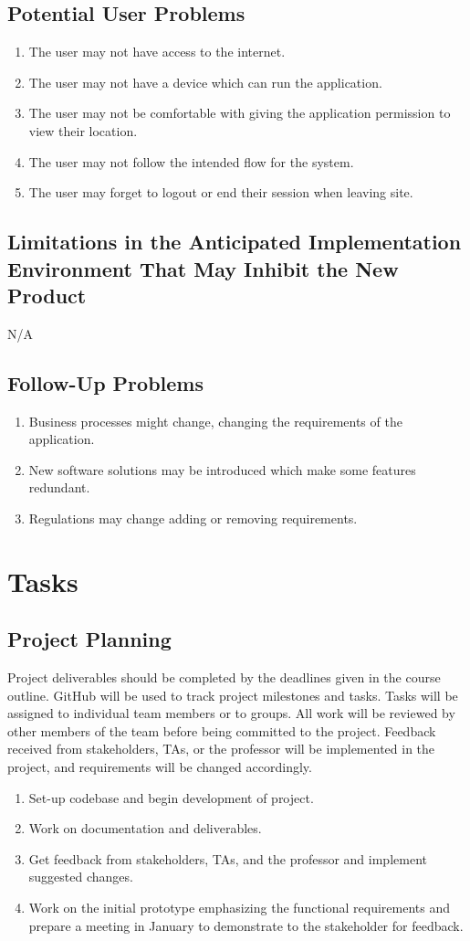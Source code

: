 \documentclass[12pt]{article}
\begin{document}
\subsection{Potential User Problems}
\begin{enumerate}
  \item The user may not have access to the internet.
  \item The user may not have a device which can run the application.
  \item The user may not be comfortable with giving the application
    permission to view their location.
  \item The user may not follow the intended flow for the system.
  \item The user may forget to logout or end their session when leaving site.
\end{enumerate}
\subsection{Limitations in the Anticipated Implementation Environment That May
Inhibit the New Product}
N/A
\subsection{Follow-Up Problems}
\begin{enumerate}
  \item Business processes might change, changing the requirements of
    the application.
  \item New software solutions may be introduced which make some
    features redundant.
  \item Regulations may change adding or removing requirements.
\end{enumerate}

\section{Tasks}
\subsection{Project Planning}
Project deliverables should be completed by the deadlines given in
the course outline. GitHub will be used to track project milestones
and tasks. Tasks will be assigned to individual team members or to
groups. All work will be reviewed by other members of the team before
being committed to the project. Feedback received from stakeholders,
TAs, or the professor will be implemented in the project, and
requirements will be changed accordingly.
\begin{enumerate} [{Task }1.]
  \item Set-up codebase and begin development of project.
  \item Work on documentation and deliverables.
  \item Get feedback from stakeholders, TAs, and the professor and implement
    suggested changes.
  \item Work on the initial prototype emphasizing the functional
    requirements and prepare a meeting in January
    to demonstrate to the stakeholder for feedback.
\end{enumerate}
\end{document}
